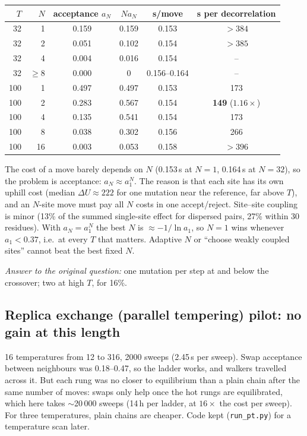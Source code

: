 \documentclass[11pt,a4paper]{article}
\newcommand{\file}[1]{\texttt{#1}}
\begin{document}
\begin{center}
\begin{tabular}{rrcccc}
\toprule
$T$ & $N$ & acceptance $a_N$ & $N a_N$ & s/move & s per decorrelation \\
\midrule
32  & 1  & 0.159 & 0.159 & 0.153 & $>384$ \\
32  & 2  & 0.051 & 0.102 & 0.154 & $>385$ \\
32  & 4  & 0.004 & 0.016 & 0.154 & -- \\
32  & $\ge8$ & 0.000 & 0 & 0.156--0.164 & -- \\
\midrule
100 & 1  & 0.497 & 0.497 & 0.153 & 173 \\
100 & 2  & 0.283 & 0.567 & 0.154 & \textbf{149} ($1.16\times$) \\
100 & 4  & 0.135 & 0.541 & 0.154 & 173 \\
100 & 8  & 0.038 & 0.302 & 0.156 & 266 \\
100 & 16 & 0.003 & 0.053 & 0.158 & $>396$ \\
\bottomrule
\end{tabular}
\end{center}

\noindent
The cost of a move barely depends on $N$ (0.153\,s at $N=1$, 0.164\,s at
$N=32$), so the problem is acceptance: $a_N\approx a_1^N$. The reason is that
each site has its own uphill cost (median $\Delta U\approx222$ for one
mutation near the reference, far above $T$), and an $N$-site move must pay all
$N$ costs in one accept/reject. Site--site coupling is minor (13\% of the
summed single-site effect for dispersed pairs, 27\% within 30 residues). With
$a_N=a_1^N$ the best $N$ is $\approx-1/\ln a_1$, so $N=1$ wins whenever
$a_1<0.37$, i.e.\ at every $T$ that matters. Adaptive $N$ or ``choose weakly
coupled sites'' cannot beat the best fixed $N$.

\emph{Answer to the original question:} one mutation per step at and below the
crossover; two at high $T$, for 16\%.

\subsection{Replica exchange (parallel tempering) pilot: no gain at this length}

16 temperatures from 12 to 316, 2000 sweeps (2.45\,s per sweep). Swap
acceptance between neighbours was 0.18--0.47, so the ladder works, and walkers
travelled across it. But each rung was no closer to equilibrium than a plain
chain after the same number of moves: swaps only help once the hot rungs are
equilibrated, which here takes $\sim$20\,000 sweeps (14\,h per ladder, at
$16\times$ the cost per sweep). For three temperatures, plain chains are
cheaper. Code kept (\file{run\_pt.py}) for a temperature scan later.
\end{document}
